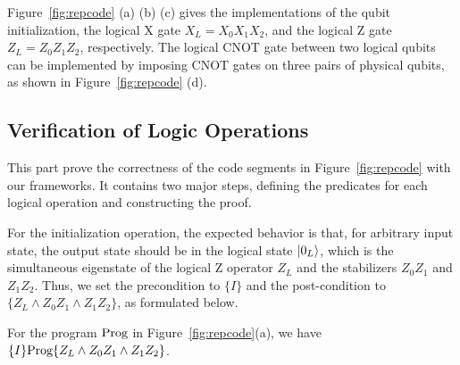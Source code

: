Figure~\ref{fig:repcode} (a) (b) (c) gives the implementations of the qubit initialization, the logical X gate $X_L = X_0X_1X_2$, and the logical Z gate $Z_L = Z_0Z_1Z_2$, respectively. 
The logical CNOT gate between two logical qubits can be implemented by imposing CNOT gates on three pairs of physical qubits, as shown in Figure~\ref{fig:repcode} (d).



\subsection{Verification of Logic Operations}




This part prove the correctness of the code segments in Figure~\ref{fig:repcode} with our frameworks. It contains two major steps, defining the predicates for each logical operation and constructing the proof. 

For the initialization operation, the expected behavior is that, for arbitrary input state, the output state should be in the logical state $\vert 0_L \rangle$, which is the simultaneous eigenstate of the logical Z operator $Z_L$ and the stabilizers $Z_0Z_1$ and $Z_1Z_2$. Thus, we set the precondition to $\{I\}$ and the post-condition to $\{Z_L\wedge Z_0Z_1 \wedge Z_1Z_2\}$, as formulated below. \nothmskip
\begin{proposition}
For the program $\text{Prog}$ in Figure~\ref{fig:repcode}(a), we have $\{I\}\text{Prog}\{Z_L\wedge Z_0Z_1 \wedge Z_1Z_2\}$.
\end{proposition}\nothmskip
{}

